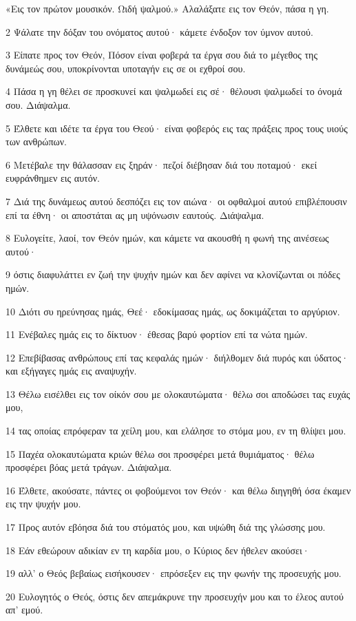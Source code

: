 \par «Εις τον πρώτον μουσικόν. Ωιδή ψαλμού.» Αλαλάξατε εις τον Θεόν, πάσα η γη.
\par 2 Ψάλατε την δόξαν του ονόματος αυτού· κάμετε ένδοξον τον ύμνον αυτού.
\par 3 Είπατε προς τον Θεόν, Πόσον είναι φοβερά τα έργα σου διά το μέγεθος της δυνάμεώς σου, υποκρίνονται υποταγήν εις σε οι εχθροί σου.
\par 4 Πάσα η γη θέλει σε προσκυνεί και ψαλμωδεί εις σέ· θέλουσι ψαλμωδεί το όνομά σου. Διάψαλμα.
\par 5 Έλθετε και ιδέτε τα έργα του Θεού· είναι φοβερός εις τας πράξεις προς τους υιούς των ανθρώπων.
\par 6 Μετέβαλε την θάλασσαν εις ξηράν· πεζοί διέβησαν διά του ποταμού· εκεί ευφράνθημεν εις αυτόν.
\par 7 Διά της δυνάμεως αυτού δεσπόζει εις τον αιώνα· οι οφθαλμοί αυτού επιβλέπουσιν επί τα έθνη· οι αποστάται ας μη υψόνωσιν εαυτούς. Διάψαλμα.
\par 8 Ευλογείτε, λαοί, τον Θεόν ημών, και κάμετε να ακουσθή η φωνή της αινέσεως αυτού·
\par 9 όστις διαφυλάττει εν ζωή την ψυχήν ημών και δεν αφίνει να κλονίζωνται οι πόδες ημών.
\par 10 Διότι συ ηρεύνησας ημάς, Θεέ· εδοκίμασας ημάς, ως δοκιμάζεται το αργύριον.
\par 11 Ενέβαλες ημάς εις το δίκτυον· έθεσας βαρύ φορτίον επί τα νώτα ημών.
\par 12 Επεβίβασας ανθρώπους επί τας κεφαλάς ημών· διήλθομεν διά πυρός και ύδατος· και εξήγαγες ημάς εις αναψυχήν.
\par 13 Θέλω εισέλθει εις τον οίκόν σου με ολοκαυτώματα· θέλω σοι αποδώσει τας ευχάς μου,
\par 14 τας οποίας επρόφεραν τα χείλη μου, και ελάλησε το στόμα μου, εν τη θλίψει μου.
\par 15 Παχέα ολοκαυτώματα κριών θέλω σοι προσφέρει μετά θυμιάματος· θέλω προσφέρει βόας μετά τράγων. Διάψαλμα.
\par 16 Έλθετε, ακούσατε, πάντες οι φοβούμενοι τον Θεόν· και θέλω διηγηθή όσα έκαμεν εις την ψυχήν μου.
\par 17 Προς αυτόν εβόησα διά του στόματός μου, και υψώθη διά της γλώσσης μου.
\par 18 Εάν εθεώρουν αδικίαν εν τη καρδία μου, ο Κύριος δεν ήθελεν ακούσει·
\par 19 αλλ' ο Θεός βεβαίως εισήκουσεν· επρόσεξεν εις την φωνήν της προσευχής μου.
\par 20 Ευλογητός ο Θεός, όστις δεν απεμάκρυνε την προσευχήν μου και το έλεος αυτού απ' εμού.

